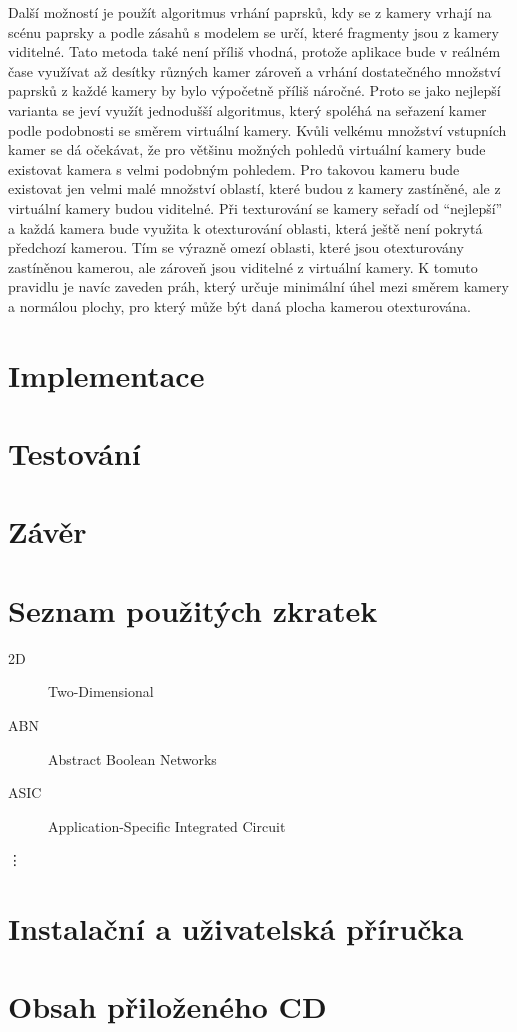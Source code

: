 \documentclass[11pt,twoside,a4paper]{book}
\begin{document}
Další možností je použít algoritmus vrhání paprsků, kdy se z kamery vrhají na scénu paprsky a podle zásahů s modelem se určí, které fragmenty jsou z kamery viditelné. Tato metoda také není příliš vhodná, protože aplikace bude v reálném čase využívat až desítky různých kamer zároveň a vrhání dostatečného množství paprsků z každé kamery by bylo výpočetně příliš náročné. Proto se jako nejlepší varianta se jeví využít jednodušší algoritmus, který spoléhá na seřazení kamer podle podobnosti se směrem virtuální kamery. Kvůli velkému množství vstupních kamer se dá očekávat, že pro většinu možných pohledů virtuální kamery bude existovat kamera s velmi podobným pohledem. Pro takovou kameru bude existovat jen velmi malé množství oblastí, které budou z kamery zastíněné, ale z virtuální kamery budou viditelné. Při texturování se kamery seřadí od ``nejlepší'' a každá kamera bude využita k otexturování oblasti, která ještě není pokrytá předchozí kamerou. Tím se výrazně omezí oblasti, které jsou otexturovány zastíněnou kamerou, ale zároveň jsou viditelné z virtuální kamery. K tomuto pravidlu je navíc zaveden práh, který určuje minimální úhel mezi směrem kamery a normálou plochy, pro který může být daná plocha kamerou otexturována. 



\chapter{Implementace}

\chapter{Testování}

\chapter{Závěr}


\renewcommand\refname{Zdroje}

\def\CS{$\cal C\kern-0.1667em\lower.5ex\hbox{$\cal S$}\kern-0.075em $}



\appendix


\chapter{Seznam použitých zkratek}

\begin{description}
\item[2D] Two-Dimensional
\item[ABN] Abstract Boolean Networks
\item[ASIC] Application-Specific Integrated Circuit
\end{description}
\vdots

\chapter{Instalační a uživatelská příručka}

\chapter{Obsah přiloženého CD}
\end{document}
